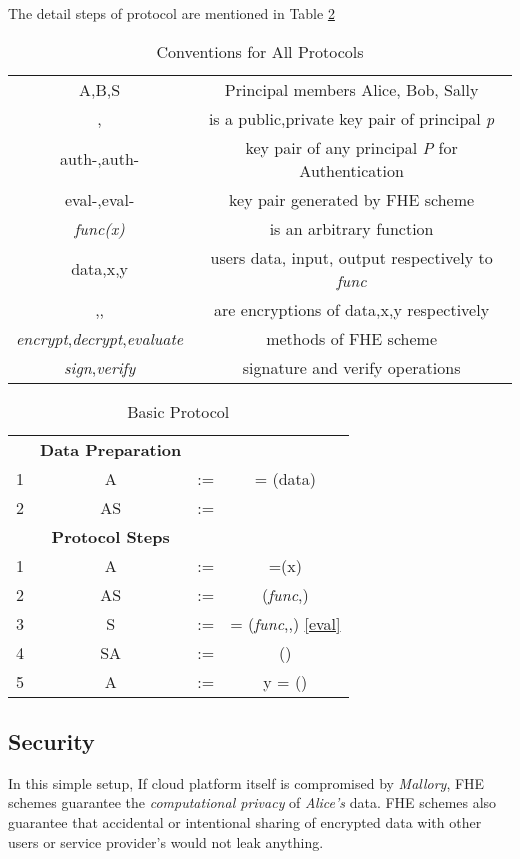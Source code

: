 \documentclass[conference]{IEEEtran}
\numberwithin{equation}{section}
\begin{document}
The detail steps of protocol are mentioned in Table \ref{basicProtocol} 
\begin{table}
\caption {Conventions for All Protocols } 
\label{conventionAll}
\renewcommand{\arraystretch}{2.5}
\begin{center}
\begin{tabular} {|c  c|}
\hline
 {A,B,S} & Principal members Alice, Bob, Sally \\
 {,} & is a public,private key pair of principal \emph{p}\\
 {auth-,auth-} & {key pair of any principal \emph{P} for Authentication} \\
 {eval-,eval-} & {key pair generated by FHE scheme} \\
 {\emph{func(x)}} & {is an arbitrary function} \\
 {data,x,y} & {users data, input, output respectively to \emph{func}} \\
 {,, } & {are encryptions of data,x,y respectively} \\
 {\emph{encrypt},\emph{decrypt},\emph{evaluate}} & {methods of FHE scheme} \\
 {\emph{sign},\emph{verify}} & {signature and verify operations} \\
 \hline
\end{tabular}
\end{center}
\end{table}
\begin{table}
\caption{Basic Protocol}
\label{basicProtocol}
\renewcommand{\arraystretch}{2.5}
\begin{center}
\begin{tabular} {| c c c c | }
\hline
&\bf{Data Preparation}&&  \\
{1} & {A} & {:=} & {{}= (data)} \\
{2} & {AS} & {:=} & {} \\
\hline
\hline
&\bf{Protocol Steps}&&\\
{1} &{A} & {:=} & {{}=(x)} \\
{2} & {AS}&{:=} & { (\emph{func},)} \\
{3} & {S}&{:=}&{ {}= (\emph{func},,) \eqref{eval}} \\
{4} & {SA}& {:=} & {()} \\
{5} & {A}& {:=} & {y =  ()} \\
\hline
\end{tabular} 
\end{center}
\end{table}
 \subsection{Security}
In this simple setup, If cloud platform itself is compromised by \emph{Mallory}, FHE schemes guarantee the \emph{computational privacy} of \emph{Alice's} data. FHE schemes also guarantee that accidental or intentional sharing of encrypted data with other users or service provider's would not leak anything.
\end{document}
